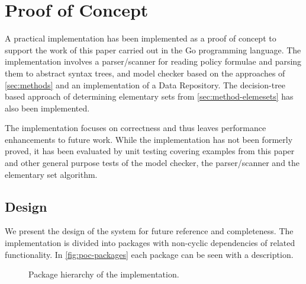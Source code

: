 \section{Proof of Concept}\label{app:poc}
A practical implementation has been implemented as a proof of concept to support the work of this paper carried out in the Go programming language. The implementation involves a parser/scanner for reading policy formulae and parsing them to abstract syntax trees, and model checker based on the approaches of \ref{sec:methods} and an implementation of a Data Repository. The decision-tree based approach of determining elementary sets from \ref{sec:method-elemesets} has also been implemented.

The implementation focuses on correctness and thus leaves performance enhancements to future work. While the implementation has not been formerly proved, it has been evaluated by unit testing covering examples from this paper and other general purpose tests of the model checker, the parser/scanner and the elementary set algorithm.

\subsection{Design}
We present the design of the system for future reference and completeness. The implementation is divided into packages with non-cyclic dependencies of related functionality. In \autoref{fig:poc-packages} each package can be seen with a description.

\begin{figure}[!ht]
    \centering
    \caption{Package hierarchy of the implementation.}
    \label{fig:poc-packages}
\end{figure}

